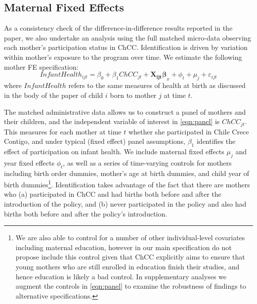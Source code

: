 \documentclass[12pt]{article}
\begin{document}
\begin{spacing}{1.4}
\section{Maternal Fixed Effects}
\label{MFE}
As a consistency check of the difference-in-difference results  
reported in the paper, we also undertake an analysis using the
full matched micro-data observing each mother's participation
status in ChCC.  Identification is driven by variation within
mother's exposure to the program over time.  We estimate the
following mother FE specification:
\begin{equation}
  \label{eqn:panel}
  Infant Health_{ijt} = \beta_0 + \beta_1 ChCC_{jt} + \bm{X_{ijt}\beta}_{x} + \phi_t + \mu_j + \varepsilon_{ijt}
\end{equation}
where $InfantHealth$ refers to the same measures of health at
birth as discussed in the body of the paper of child $i$ born
to mother $j$ at time $t$.

The matched administrative data allows us to construct a panel
of mothers and their children, and the independent variable of
interest in \ref{eqn:panel} is $ChCC_{jt}$.  This measures for
each mother at time $t$ whether she participated in Chile Crece
Contigo, and under typical (fixed effect) panel assumptions,
$\beta_1$ identifies the effect of participation on infant health.
We include maternal fixed effects $\mu_j$ and year fixed effects
$\phi_t$, as well as a series of time-varying controls for
mothers including birth order dummies, mother's age at birth
dummies, and child year of birth dummies\footnote{We are also
  able to control for a number of other individual-level
  covariates including maternal education, however in our main
  specification do not propose include this control given that
  ChCC explicitly aims to ensure that young mothers who are still
  enrolled in education finish their studies, and hence education
  is likely a bad control.  In supplementary analyses we augment
  the controls in \ref{eqn:panel} to examine the robustness of
  findings to alternative specifications.}.  Identification takes
advantage of the fact that there are mothers who (a) participated
in ChCC and had births both before and after the introduction of
the policy, and (b) never participated in the policy and also had
births both before and after the policy's introduction.


\end{spacing}
\end{document}
